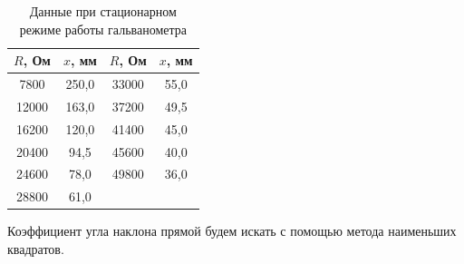 \documentclass[a4paper,12pt]{article}
\begin{document}
\begin{table}[H]\label{tab: DataDynRejim}
    \centering
    \begin{tabular}{|c|c|c|c|}
        \hline
        {\color[HTML]{000000} $R$, Ом} & {\color[HTML]{000000} $x$, мм} & {\color[HTML]{000000} $R$, Ом} & {\color[HTML]{000000} $x$, мм} \\ \hline
        {\color[HTML]{000000} 7800}  & {\color[HTML]{000000} 250,0} & {\color[HTML]{000000} 33000} & {\color[HTML]{000000} 55,0} \\ \hline
        {\color[HTML]{000000} 12000} & {\color[HTML]{000000} 163,0} & {\color[HTML]{000000} 37200} & {\color[HTML]{000000} 49,5} \\ \hline
        {\color[HTML]{000000} 16200} & {\color[HTML]{000000} 120,0} & {\color[HTML]{000000} 41400} & {\color[HTML]{000000} 45,0} \\ \hline
        {\color[HTML]{000000} 20400} & {\color[HTML]{000000} 94,5}  & {\color[HTML]{000000} 45600} & {\color[HTML]{000000} 40,0} \\ \hline
        {\color[HTML]{000000} 24600} & {\color[HTML]{000000} 78,0}  & {\color[HTML]{000000} 49800} & {\color[HTML]{000000} 36,0} \\ \hline
        {\color[HTML]{000000} 28800} & {\color[HTML]{000000} 61,0}  & {\color[HTML]{000000} }      & {\color[HTML]{000000} }     \\ \hline
    \end{tabular}
    \caption{Данные при стационарном режиме работы гальванометра}
\end{table}

Коэффициент угла наклона прямой будем искать с помощью метода наименьших квадратов. 
\end{document}
